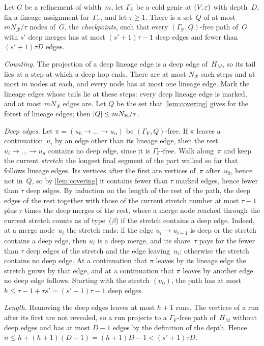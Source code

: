 \begin{lemma}\label{lem:short-paths}
Let $G$ be a refinement of width~$m$, let $\Gamma_{\mathrm F}$ be a cold genie at $(V,\varepsilon)$ with depth~$D$, fix a
lineage assignment for~$\Gamma_{\mathrm F}$, and let $\tau\ge1$. There is a set~$Q$ of at most $mN_{\mathcal R}/\tau$
nodes of~$G$, the \emph{checkpoints}, such that every $(\Gamma_{\mathrm F},Q)$-free path of~$G$ with $s'$ deep merges has
at most $(s'+1)\tau-1$ deep edges and fewer than $(s'+1)\tau D$ edges.
\end{lemma}

\begin{outline}
\emph{Counting.} The projection of a deep lineage edge is a deep edge of~$H_M$, so its tail lies at a step at which a
deep hop ends. There are at most $N_{\mathcal R}$ such steps and at most $m$ nodes at each, and every node has at most
one lineage edge. Mark the lineage edges whose tails lie at these steps: every deep lineage edge is marked, and at most
$mN_{\mathcal R}$ edges are. Let $Q$ be the set that \cref{lem:covering} gives for the forest of lineage edges; then
$\lvert Q \rvert\le mN_{\mathcal R}/\tau$.

\emph{Deep edges.} Let $\pi=(u_0\to\dots\to u_n)$ be $(\Gamma_{\mathrm F},Q)$-free. If $\pi$ leaves a continuation~$u_i$
by an edge other than its lineage edge, then the rest $u_i\to\dots\to u_n$ contains no deep edge, since it is
$\Gamma_{\mathrm F}$-free. Walk along~$\pi$ and keep the current \emph{stretch}: the longest final segment of the part
walked so far that follows lineage edges. Its vertices after the first are vertices of~$\pi$ after~$u_0$, hence not
in~$Q$, so by \cref{lem:covering} it contains fewer than $\tau$ marked edges, hence fewer than $\tau$ deep edges. By
induction on the length of the rest of the path, the deep edges of the rest together with those of the current stretch
number at most $\tau-1$ plus $\tau$ times the deep merges of the rest, where a merge node reached through the current
stretch counts as of type~($\beta$) if the stretch contains a deep edge. Indeed, at a merge node~$u_i$ the stretch ends:
if the edge $u_i\to u_{i+1}$ is deep or the stretch contains a deep edge, then $u_i$ is a deep merge, and its share~$\tau$
pays for the fewer than $\tau$ deep edges of the stretch and the edge leaving~$u_i$; otherwise the stretch contains no
deep edge. At a continuation that $\pi$ leaves by its lineage edge the stretch grows by that edge, and at a continuation
that $\pi$ leaves by another edge no deep edge follows. Starting with the stretch $(u_0)$, the path has at most
$h\le\tau-1+\tau s'=(s'+1)\tau-1$ deep edges.

\emph{Length.} Removing the deep edges leaves at most $h+1$ runs. The vertices of a run after its first are not revealed,
so a run projects to a $\Gamma_{\mathrm F}$-free path of~$H_M$ without deep edges and has at most $D-1$ edges by the
definition of the depth. Hence $n\le h+(h+1)(D-1)=(h+1)D-1<(s'+1)\tau D$.
\end{outline}

